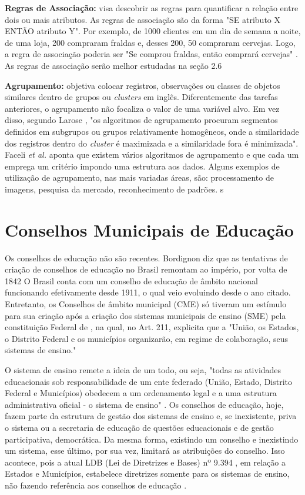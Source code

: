 \documentclass[tg]{mdtufsm}
\begin{document}
\textbf{Regras de Associação:} visa descobrir as regras para quantificar a relação entre dois ou mais atributos. As regras de associação são da forma "SE atributo X ENTÃO atributo Y". Por exemplo, de 1000 clientes em um dia de semana a noite, de uma loja, 200 compraram fraldas e, desses 200, 50 compraram cervejas. Logo, a regra de associação poderia ser "Se comprou fraldas, então comprará cervejas" \cite{pang-ning}. As regras de associação serão melhor estudadas na seção 2.6

\textbf{Agrupamento:} objetiva colocar registros, observações ou classes de objetos similares dentro de grupos ou \textit{clusters} em inglês. Diferentemente das tarefas anteriores, o agrupamento não focaliza o valor de uma variável alvo. Em vez disso, segundo Larose \citeyearpar{larose2005}, "os algoritmos de agrupamento procuram segmentos definidos em subgrupos ou grupos relativamente homogêneos, onde a similaridade dos registros dentro do \textit{cluster} é maximizada e a similaridade fora é minimizada". Faceli \textit{et al.} \citeyearpar{faceli} aponta que existem vários algoritmos de agrupamento e que cada um emprega um critério impondo uma estrutura aos dados. Alguns exemplos de utilização de agrupamento, nas mais variadas áreas, são: processamento de imagens, pesquisa da mercado, reconhecimento de padrões. s

\section{Conselhos Municipais de Educação}

Os conselhos de educação não são recentes. Bordignon \citeyearpar{bordignon2009} diz que as tentativas de criação de conselhos de educação no Brasil remontam ao império, por volta de 1842 O Brasil conta com um conselho de educação de âmbito nacional funcionando efetivamente desde 1911, o qual veio evoluindo desde o ano citado. Entretanto, os Conselhos de âmbito municipal (CME) só tiveram um estímulo para sua criação após a criação dos sistemas municipais de ensino (SME) pela constituição Federal de \citeyearpar{const1988}, na qual, no Art. 211, explicita que a "União, os Estados, o Distrito Federal e os municípios organizarão, em regime de colaboração, seus sistemas de ensino."

O sistema de ensino remete a ideia de um todo, ou seja, "todas as atividades educacionais sob responsabilidade de um ente federado (União, Estado, Distrito Federal e Municípios) obedecem a um ordenamento legal e a uma estrutura administrativa oficial - o sistema de ensino" \cite{caderno-perfil}. Os conselhos de educação, hoje, fazem parte da estrutura de gestão dos sistemas de ensino e, se inexistente, priva o sistema ou a secretaria de educação de questões educacionais e de gestão participativa, democrática. Da mesma forma, existindo um conselho e inexistindo um sistema, esse último, por sua vez, limitará as atribuições do conselho. Isso acontece, pois a atual LDB (Lei de Diretrizes e Bases) nº 9.394 \citeyearpar{ldb}, em relação a Estados e Municípios, estabelece diretrizes somente para os sistemas de ensino, não fazendo referência aos conselhos de educação \cite{caderno-perfil}.
\end{document}
